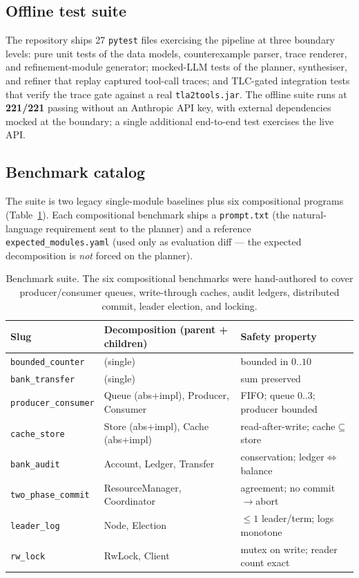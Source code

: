 \documentclass[11pt]{article}
\begin{document}
\subsection{Offline test suite}\label{ssec:tests}
The repository ships 27 \texttt{pytest} files exercising the pipeline at three
boundary levels: pure unit tests of the data models, counterexample parser,
trace renderer, and refinement-module generator; mocked-LLM tests of the planner,
synthesiser, and refiner that replay captured tool-call traces; and TLC-gated
integration tests that verify the trace gate against a real
\texttt{tla2tools.jar}. The offline suite runs at \textbf{221/221} passing without
an Anthropic API key, with external dependencies mocked at the boundary; a single
additional end-to-end test exercises the live API.

\subsection{Benchmark catalog}\label{ssec:bench-catalog}
The suite is two legacy single-module baselines plus six
compositional programs (Table~\ref{tbl:bench}). Each compositional
benchmark ships a \texttt{prompt.txt} (the natural-language requirement
sent to the planner) and a reference \texttt{expected\_modules.yaml}
(used only as evaluation diff --- the expected decomposition is
\emph{not} forced on the planner).

\begin{table}[t]
\centering
\small
\begin{tabular}{lll}
\toprule
Slug & Decomposition (parent + children) & Safety property \\
\midrule
\texttt{bounded\_counter}   & (single)                                & bounded in $0..10$ \\
\texttt{bank\_transfer}     & (single)                                & sum preserved \\
\midrule
\texttt{producer\_consumer} & Queue (abs+impl), Producer, Consumer & FIFO; queue $0..3$; producer bounded \\
\texttt{cache\_store}       & Store (abs+impl), Cache (abs+impl)   & read-after-write; cache${\subseteq}$store \\
\texttt{bank\_audit}        & Account, Ledger, Transfer            & conservation; ledger${\Leftrightarrow}$balance \\
\texttt{two\_phase\_commit} & ResourceManager, Coordinator         & agreement; no commit${\to}$abort \\
\texttt{leader\_log}        & Node, Election                       & ${\leq}1$ leader/term; logs monotone \\
\texttt{rw\_lock}           & RwLock, Client                       & mutex on write; reader count exact \\
\bottomrule
\end{tabular}
\caption{Benchmark suite. The six compositional benchmarks were
hand-authored to cover producer/consumer queues, write-through caches,
audit ledgers, distributed commit, leader election, and locking.}
\label{tbl:bench}
\end{table}
\end{document}
